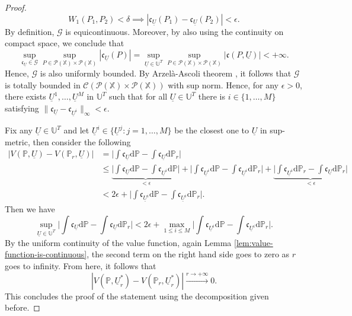 \documentclass[11pt]{article}
\newcommand{\XX}{\mathbb{X}}
\newcommand{\UU}{\mathbb{U}}
\newcommand{\PP}{\mathbb{P}}
\newcommand{\cC}{\mathcal{C}}
\newcommand{\cG}{\mathcal{G}}
\newcommand{\cP}{\mathcal{P}}
\newcommand{\fc}{\mathfrak{c}}
\newcommand{\de}{\mathrm{d}} %
\begin{document}
\begin{proof}
\begin{equation*}
        W_1(P_1, P_2) < \delta \implies |\fc_{\underline{U}}(P_1) - \fc_{\underline{U}}(P_2)| < \epsilon.
    \end{equation*}
    By definition, $\cG$ is equicontinuous. Moreover, by also using the continuity on compact space, we conclude that
    \begin{equation*}
        \sup_{\fc_{\underline{U}}\in\cG}\sup_{P\in\cP(\XX)\times\cP(\XX)}|\fc_{\underline{U}}(P)|=\sup_{\underline{U}\in\UU^T}\sup_{P\in\cP(\XX)\times\cP(\XX)}|\fc(P, \underline{U})| < +\infty.
    \end{equation*}
    Hence, $\cG$ is also uniformly bounded. By Arzelà-Ascoli theorem \cite[Theorem VI-3.8]{conway1994course}, it follows that $\cG$ is totally bounded in $\cC(\cP(\XX)\times\cP(\XX))$ with sup norm. Hence, for any $\epsilon > 0$, there exists $\underline{U}^1,\ldots,\underline{U}^M$ in $\UU^T$ such that for all $\underline{U}\in\UU^T$ there is $i\in\{1,\ldots, M\}$ satisfying $\|\fc_{\underline{U}} - \fc_{\underline{U}^i}\|_{\infty} < \epsilon$.

    Fix any $\underline{U}\in\UU^T$ and let $\underline{U}^i\in\{\underline{U}^j : j=1,\ldots, M\}$ be the closest one to $\underline{U}$ in sup-metric, then consider the following
    \begin{align*}
        |V(\PP, \underline{U}) - V(\PP_r,\underline{U})| &= \bigg|\int\fc_{\underline{U}}\de\PP - \int \fc_{\underline{U}}\de\PP_r\bigg|\\
        &\leq \underbrace{\bigg|\int\fc_{\underline{U}}\de\PP - \int\fc_{\underline{U}^i}\de\PP \bigg|}_{<\epsilon} + \bigg|\int\fc_{\underline{U}^i}\de\PP - \int\fc_{\underline{U}^i}\de\PP_r \bigg| + \underbrace{\bigg|\int\fc_{\underline{U}^i}\de\PP_r - \int\fc_{\underline{U}}\de\PP_r\bigg|}_{<\epsilon}\\
        &<2\epsilon + \bigg|\int\fc_{\underline{U}^i}\de\PP - \int\fc_{\underline{U}^i}\de\PP_r \bigg|.
    \end{align*}
    Then we have 
    \begin{equation*}
        \sup_{\underline{U}\in\UU^T}\bigg|\int\fc_{\underline{U}}\de\PP - \int \fc_{\underline{U}}\de\PP_r\bigg| < 2\epsilon + \max_{1 \leq i\leq M}\bigg|\int\fc_{\underline{U}^i}\de\PP - \int\fc_{\underline{U}^i}\de\PP_r \bigg|.
    \end{equation*}
    By the uniform continuity of the value function, again Lemma \ref{lem:value-function-is-continuous}, the second term on the right hand side goes to zero as $r$ goes to infinity. From here, it follows that
    \begin{equation*}
        |V(\PP, \underline{U}_r^*) - V(\PP_r,\underline{U}_r^*)|\xrightarrow{r\to+\infty}0.
    \end{equation*}
    This concludes the proof of the statement using the decomposition given before.
\end{proof}
\end{document}
